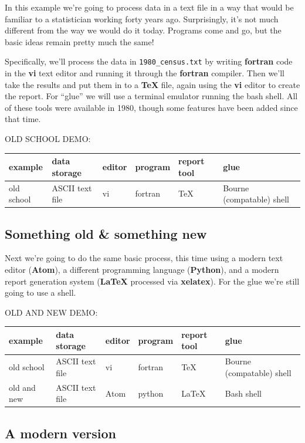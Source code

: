 \documentclass[]{book}
\begin{document}
In this example we're going to process data in a text file in a way that would be familiar to a statistician working forty years ago. Surprisingly, it's not much different from the way we would do it today. Programs come and go, but the basic ideas remain pretty much the same!

Specifically, we'll process the data in \texttt{1980\_census.txt} by writing \textbf{fortran} code in the \textbf{vi} text editor and running it through the \textbf{fortran} compiler. Then we'll take the results and put them in to a \textbf{TeX} file, again using the \textbf{vi} editor to create the report. For ``glue'' we will use a terminal emulator running the bash shell. All of these tools were available in 1980, though some features have been added since that time.

OLD SCHOOL DEMO:

\begin{longtable}[]{@{}llllll@{}}
\toprule
example & data storage & editor & program & report tool & glue\tabularnewline
\midrule
\endhead
old school & ASCII text file & vi & fortran & TeX & Bourne (compatable) shell\tabularnewline
\bottomrule
\end{longtable}

\hypertarget{something-old-something-new}{%
\subsection{Something old \& something new}\label{something-old-something-new}}

Next we're going to do the same basic process, this time using a modern text editor (\textbf{Atom}), a different programming language (\textbf{Python}), and a modern report generation system (\textbf{LaTeX} processed via \textbf{xelatex}). For the glue we're still going to use a shell.

OLD AND NEW DEMO:

\begin{longtable}[]{@{}llllll@{}}
\toprule
example & data storage & editor & program & report tool & glue\tabularnewline
\midrule
\endhead
old school & ASCII text file & vi & fortran & TeX & Bourne (compatable) shell\tabularnewline
old and new & ASCII text file & Atom & python & LaTeX & Bash shell\tabularnewline
\bottomrule
\end{longtable}

\hypertarget{a-modern-version}{%
\subsection{A modern version}\label{a-modern-version}}
\end{document}
